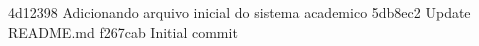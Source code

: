 4d12398 Adicionando arquivo inicial do sistema academico
5db8ec2 Update README.md
f267cab Initial commit
